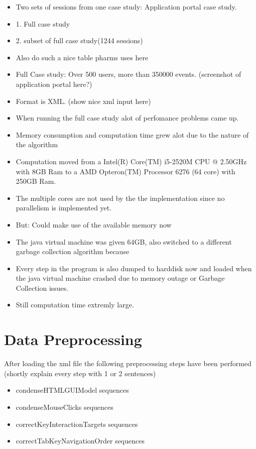 \begin{itemize}
	\item Two sets of sessions from one case study: Application portal case study. 
	\item 1. Full case study
	\item 2. subset of full case study(1244 sessions)
	\item Also do such a nice table pharms uses here
	\item Full Case study: Over 500 users, more than 350000 events. (screenshot of application portal here?)
	\item Format is XML. (show nice xml input here)
	\item When running the full case study alot of perfomance problems came up.
	\item Memory consumption and computation time grew alot due to the nature of the algorithm
	\item Computation moved from a Intel(R) Core(TM) i5-2520M CPU @ 2.50GHz with 8GB Ram to a AMD Opteron(TM) Processor 6276 (64 core) with 250GB Ram.
	\item The multiple cores are not used by the the implementation since no parallelism is implemented yet.
	\item But: Could make use of the available memory now
	\item The java virtual machine was given 64GB, also switched to a different garbage collection algorithm because
	\item Every step in the program is also dumped to harddisk now and loaded when the java virtual machine crashed due to memory outage or Garbage Collection issues.
	\item Still computation time extremly large.
\end{itemize} 

\section{Data Preprocessing}
After loading the xml file the following preprocessing steps have been performed (shortly explain every step with 1 or 2 sentences)
\begin{itemize}
	\item condenseHTMLGUIModel sequences
	\item condenseMouseClicks sequences
	\item correctKeyInteractionTargets sequences
	\item correctTabKeyNavigationOrder sequences
\end{itemize}

